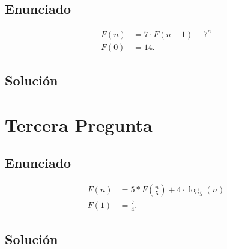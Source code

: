     \subsection*{Enunciado}
    \begin{align*}
      F\left( n \right) &= 7\cdot F\left( n -1 \right) + 7^n\\
      F\left( 0 \right) &= 14
    .\end{align*}
    \subsection*{Solución}



    \section*{Tercera Pregunta}
    \subsection*{Enunciado}
    \begin{align*}
      F\left( n \right) &= 5*F\left( \frac{n}{5} \right) + 4\cdot \log_5\left( n \right)  \\
      F\left( 1 \right) &= \frac{7}{4}
    .\end{align*}
    \subsection*{Solución}

